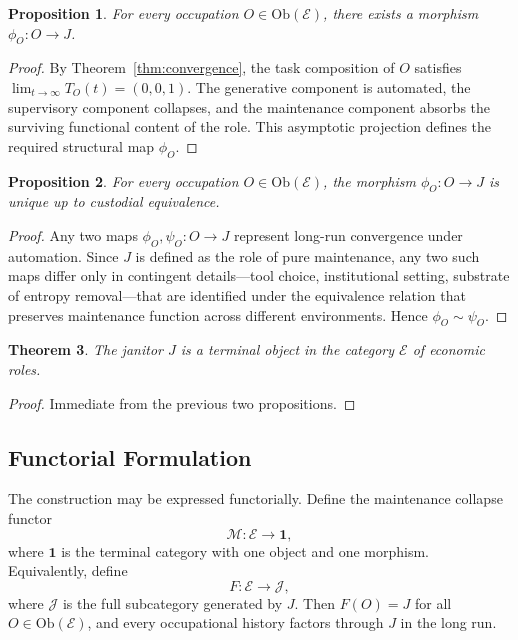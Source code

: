 \documentclass[12pt,a4paper]{article}
\theoremstyle{plain}
\newtheorem{theorem}{Theorem}[section]
\newtheorem{proposition}[theorem]{Proposition}
\theoremstyle{definition}
\theoremstyle{remark}
\begin{document}
\begin{proposition}
For every occupation $O \in \mathrm{Ob}(\mathcal{E})$, there exists a
morphism $\phi_O : O \to J$.
\end{proposition}

\begin{proof}
By Theorem~\ref{thm:convergence}, the task composition of $O$ satisfies
$\lim_{t\to\infty} T_O(t) = (0,0,1)$.  The generative component is automated,
the supervisory component collapses, and the maintenance component absorbs
the surviving functional content of the role.  This asymptotic projection
defines the required structural map $\phi_O$.
\end{proof}

\begin{proposition}
For every occupation $O \in \mathrm{Ob}(\mathcal{E})$, the morphism
$\phi_O : O \to J$ is unique up to custodial equivalence.
\end{proposition}

\begin{proof}
Any two maps $\phi_O, \psi_O : O \to J$ represent long-run convergence under
automation.  Since $J$ is defined as the role of pure maintenance, any two
such maps differ only in contingent details---tool choice, institutional
setting, substrate of entropy removal---that are identified under the
equivalence relation that preserves maintenance function across different
environments.  Hence $\phi_O \sim \psi_O$.
\end{proof}

\begin{theorem}
The janitor $J$ is a terminal object in the category $\mathcal{E}$ of economic
roles.
\end{theorem}

\begin{proof}
Immediate from the previous two propositions.
\end{proof}

\subsection{Functorial Formulation}

The construction may be expressed functorially.  Define the maintenance
collapse functor
\[
\mathcal{M} : \mathcal{E} \to \mathbf{1},
\]
where $\mathbf{1}$ is the terminal category with one object and one morphism.
Equivalently, define
\[
F : \mathcal{E} \to \mathcal{J},
\]
where $\mathcal{J}$ is the full subcategory generated by $J$.  Then
$F(O) = J$ for all $O \in \mathrm{Ob}(\mathcal{E})$, and every occupational
history factors through $J$ in the long run.
\end{document}
